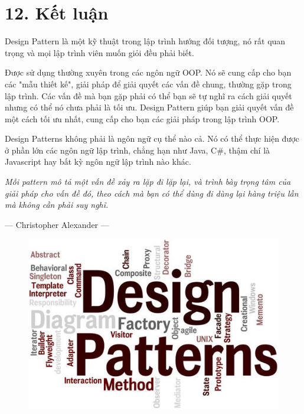 \chapter{12. Kết luận}
Design Pattern là một kỹ thuật trong lập trình hướng đối tượng, nó rất quan trọng và mọi lập trình viên muốn giỏi đều phải biết.

Được sử dụng thường xuyên trong các ngôn ngữ OOP. Nó sẽ cung cấp cho bạn các "mẫu thiết kế", giải pháp để giải quyết các vấn đề chung, thường gặp trong lập trình. Các vấn đề mà bạn gặp phải có thể bạn sẽ tự nghĩ ra cách giải quyết nhưng có thể nó chưa phải là tối ưu. Design Pattern giúp bạn giải quyết vấn đề một cách tối ưu nhất, cung cấp cho bạn các giải pháp trong lập trình OOP.

Design Patterns không phải là ngôn ngữ cụ thể nào cả. Nó có thể thực hiện được ở phần lớn các ngôn ngữ lập trình, chẳng hạn như Java, C\#, thậm chí là Javascript hay bất kỳ ngôn ngữ lập trình nào khác.

\textit{Mỗi pattern mô tả một vấn đề xảy ra lặp đi lặp lại, và trình bày trọng tâm của giải pháp cho vấn đề đó, theo cách mà bạn có thể dùng đi dùng lại hàng triệu lần mà không cần phải suy nghĩ.}
\begin{flushright}
— Christopher Alexander —
\end{flushright}

\begin{figure}[!htb]
    \centering
    \includegraphics[width=\textwidth]{fig/Conclusion/design-patterns.jpg}
    \label{fig:design-patterns}
\end{figure}
\newpage
